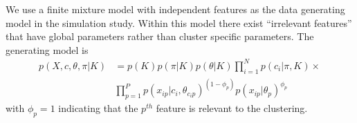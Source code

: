 \documentclass{bioinfo}
\begin{document}
We use a finite mixture model with independent features as the data generating model in the simulation study.
Within this model there exist ``irrelevant features'' \citep{law2003feature} that have global parameters rather than cluster specific parameters. 
The generating model is
\begin{align*}
p(X, c, \theta, \pi| K) &= p(K) p(\pi| K) p(\theta|K) \prod_{i=1}^N p (c_i | \pi, K)  \times \\
  & \prod_{p=1}^P p(x_{ip} | c_i, \theta_{c_ip})^{(1 - \phi_p)} p(x_{ip} | \theta_p) ^ {\phi_p}
\end{align*}
with $\phi_p=1$ indicating that the $p^{th}$ feature is relevant to the clustering. 
\end{document}
